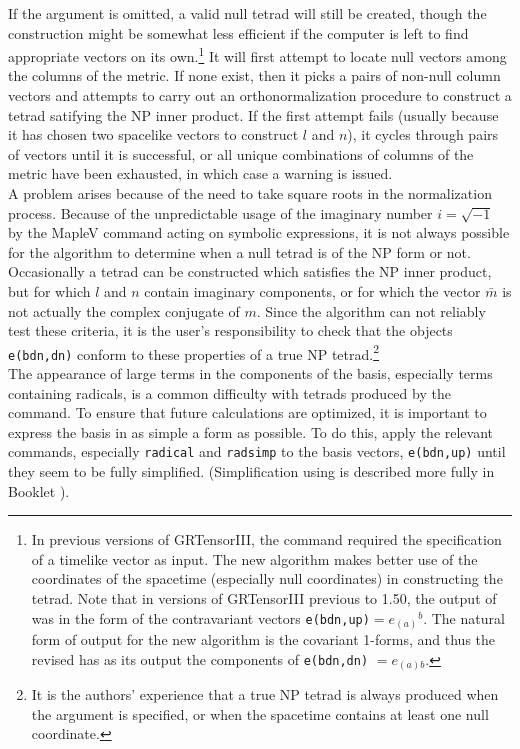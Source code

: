 \documentclass{article}
\begin{document}
If the argument is omitted, a valid null tetrad will still be created,
though the construction might be somewhat less efficient if the
computer is left to find appropriate vectors on its own.\footnote{In
previous versions of GRTensorIII, the  command required
the specification of a timelike vector as input. The new algorithm
makes better use of the coordinates of the spacetime (especially null
coordinates) in constructing the tetrad. Note that in versions of
GRTensorIII previous to 1.50, the output of  was in the
form of the contravariant vectors
\texttt{e(bdn,up)}$=e_{(a)}{}^b$. The natural form of output for the
new algorithm is the covariant 1-forms, and thus the revised
 has as its output the components of
\texttt{e(bdn,dn)} $= e_{(a)b}$.}  It will first attempt to locate
null vectors among the columns of the metric. If none exist, then it
picks a pairs of non-null column vectors and attempts to carry out an
orthonormalization procedure to construct a tetrad satifying the NP
inner product. If the first attempt fails (usually because it has
chosen two spacelike vectors to construct $l$ and $n$), it cycles
through pairs of vectors until it is successful, or all unique
combinations of columns of the metric have been exhausted, in which
case a warning is issued.\\

A problem arises because of the need to take square roots in the
normalization process. Because of the unpredictable usage of the
imaginary number $i=\sqrt{-1}$ by the MapleV  command
acting on symbolic expressions, it is not always possible for the
algorithm to determine when a null tetrad is of the NP form or
not. Occasionally a tetrad can be constructed which satisfies the NP
inner product, but for which $l$ and $n$ contain imaginary components,
or for which the vector $\bar{m}$ is not actually the complex
conjugate of $m$.  Since the algorithm can not reliably test these
criteria, it is the user's responsibility to check that the objects
\texttt{e(bdn,dn)} conform to these properties of a true NP
tetrad.\footnote{It is the authors' experience that a true NP tetrad
is always produced when the  argument is specified,
or when the spacetime contains at least one null coordinate.}\\

The appearance of large terms in the components of the basis,
especially terms containing radicals, is a common difficulty with
tetrads produced by the  command. To ensure that
future calculations are optimized, it is important to express the
basis in as simple a form as possible. To do this, apply the relevant
 commands, especially \texttt{radical} and
\texttt{radsimp} to the basis vectors, \texttt{e(bdn,up)} until they
seem to be fully simplified. (Simplification using  is
described more fully in Booklet \grCalcRef).\\
\end{document}
